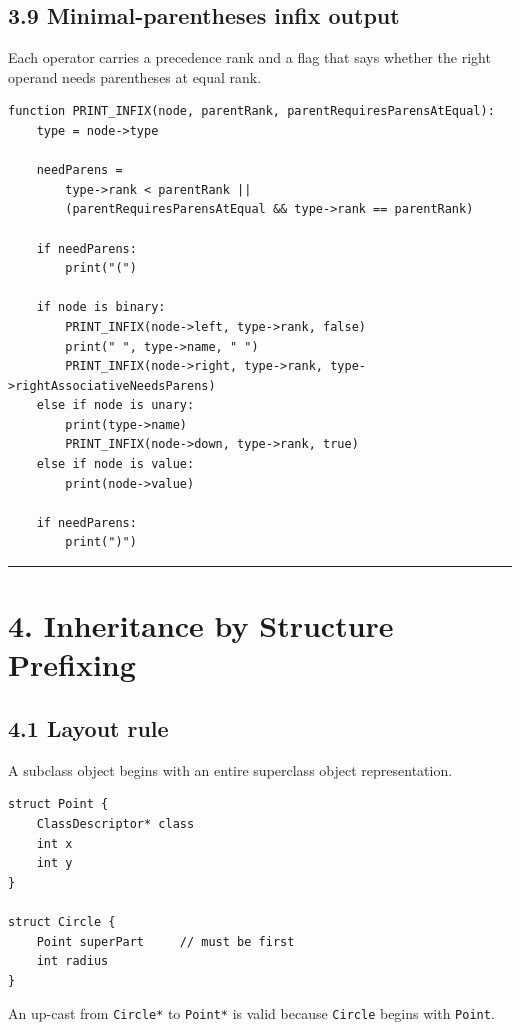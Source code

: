 \documentclass[11pt]{article}
\begin{document}
\subsection{3.9 Minimal-parentheses infix
output}\label{minimal-parentheses-infix-output}

Each operator carries a precedence rank and a flag that says whether the
right operand needs parentheses at equal rank.

\begin{verbatim}
function PRINT_INFIX(node, parentRank, parentRequiresParensAtEqual):
    type = node->type

    needParens =
        type->rank < parentRank ||
        (parentRequiresParensAtEqual && type->rank == parentRank)

    if needParens:
        print("(")

    if node is binary:
        PRINT_INFIX(node->left, type->rank, false)
        print(" ", type->name, " ")
        PRINT_INFIX(node->right, type->rank, type->rightAssociativeNeedsParens)
    else if node is unary:
        print(type->name)
        PRINT_INFIX(node->down, type->rank, true)
    else if node is value:
        print(node->value)

    if needParens:
        print(")")
\end{verbatim}

\begin{center}\rule{0.5\linewidth}{0.5pt}\end{center}

\section{4. Inheritance by Structure
Prefixing}\label{inheritance-by-structure-prefixing}

\subsection{4.1 Layout rule}\label{layout-rule}

A subclass object begins with an entire superclass object
representation.

\begin{verbatim}
struct Point {
    ClassDescriptor* class
    int x
    int y
}

struct Circle {
    Point superPart     // must be first
    int radius
}
\end{verbatim}

An up-cast from \texttt{Circle*} to
\texttt{Point*} is valid because
\texttt{Circle} begins with
\texttt{Point}.
\end{document}
